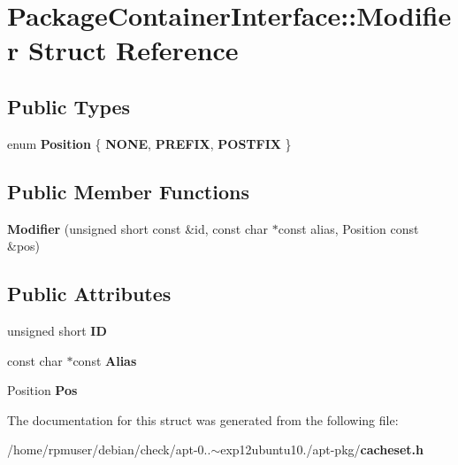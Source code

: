 \section{\-Package\-Container\-Interface\-:\-:\-Modifier \-Struct \-Reference}
\label{structAPT_1_1PackageContainerInterface_1_1Modifier}
\subsection*{\-Public \-Types}
\begin{DoxyCompactItemize}
\item 
enum {\bfseries \-Position} \{ {\bfseries \-N\-O\-N\-E}, 
{\bfseries \-P\-R\-E\-F\-I\-X}, 
{\bfseries \-P\-O\-S\-T\-F\-I\-X}
 \}
\end{DoxyCompactItemize}
\subsection*{\-Public \-Member \-Functions}
\begin{DoxyCompactItemize}
\item 
{\bfseries \-Modifier} (unsigned short const \&id, const char $\ast$const alias, \-Position const \&pos)\label{structAPT_1_1PackageContainerInterface_1_1Modifier_a4a253e1662e54fa6a7ab5064cb8c83a7}

\end{DoxyCompactItemize}
\subsection*{\-Public \-Attributes}
\begin{DoxyCompactItemize}
\item 
unsigned short {\bfseries \-I\-D}\label{structAPT_1_1PackageContainerInterface_1_1Modifier_a079e9ceeace88427313caef809d32dee}

\item 
const char $\ast$const {\bfseries \-Alias}\label{structAPT_1_1PackageContainerInterface_1_1Modifier_a5c49213c5e29a65db2a3378b543ca7d3}

\item 
\-Position {\bfseries \-Pos}\label{structAPT_1_1PackageContainerInterface_1_1Modifier_ab6c2931d7066526de7ed805cc1f7d90c}

\end{DoxyCompactItemize}


\-The documentation for this struct was generated from the following file\-:\begin{DoxyCompactItemize}
\item 
/home/rpmuser/debian/check/apt-\/0..$\sim$exp12ubuntu10./apt-\/pkg/{\bf cacheset.\-h}\end{DoxyCompactItemize}
